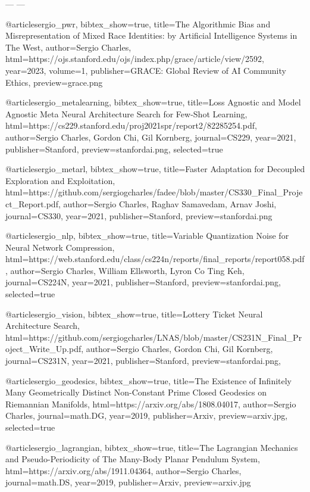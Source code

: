 ---
---


@article{sergio_pwr,
  bibtex_show={true},
  title={The Algorithmic Bias and Misrepresentation of Mixed Race Identities: by Artificial Intelligence Systems in The West},
  author={Sergio Charles},
  html={https://ojs.stanford.edu/ojs/index.php/grace/article/view/2592},
  year={2023},
  volume={1},
  publisher={GRACE: Global Review of AI Community Ethics},
  preview={grace.png}
}

@article{sergio_metalearning,
  bibtex_show={true},
  title={Loss Agnostic and Model Agnostic Meta Neural Architecture Search for Few-Shot Learning},
  html={https://cs229.stanford.edu/proj2021spr/report2/82285254.pdf},
  author={Sergio Charles, Gordon Chi, Gil Kornberg},
  journal={CS229},
  year={2021},
  publisher={Stanford},
  preview={stanfordai.png},
  selected={true}
}

@article{sergio_metarl,
  bibtex_show={true},
  title={Faster Adaptation for Decoupled Exploration and Exploitation},
  html={https://github.com/sergiogcharles/fadee/blob/master/CS330_Final_Project_Report.pdf},
  author={Sergio Charles, Raghav Samavedam, Arnav Joshi},
  journal={CS330},
  year={2021},
  publisher={Stanford},
  preview={stanfordai.png}
}

@article{sergio_nlp,
  bibtex_show={true},
  title={Variable Quantization Noise for Neural Network Compression},
  html={https://web.stanford.edu/class/cs224n/reports/final_reports/report058.pdf},
  author={Sergio Charles, William Ellsworth, Lyron Co Ting Keh},
  journal={CS224N},
  year={2021},
  publisher={Stanford},
  preview={stanfordai.png},
  selected={true}
}

@article{sergio_vision,
  bibtex_show={true},
  title={Lottery Ticket Neural Architecture Search},
  html={https://github.com/sergiogcharles/LNAS/blob/master/CS231N_Final_Project_Write_Up.pdf},
  author={Sergio Charles, Gordon Chi, Gil Kornberg},
  journal={CS231N},
  year={2021},
  publisher={Stanford},
  preview={stanfordai.png},
}

@article{sergio_geodesics,
  bibtex_show={true},
  title={The Existence of Infinitely Many Geometrically Distinct Non-Constant Prime Closed Geodesics on Riemannian Manifolds},
  html={https://arxiv.org/abs/1808.04017},
  author={Sergio Charles},
  journal={math.DG},
  year={2019},
  publisher={Arxiv},
  preview={arxiv.jpg},
  selected={true}
}

@article{sergio_lagrangian,
  bibtex_show={true},
  title={The Lagrangian Mechanics and Pseudo-Periodicity of The Many-Body Planar Pendulum System},
  html={https://arxiv.org/abs/1911.04364},
  author={Sergio Charles},
  journal={math.DS},
  year={2019},
  publisher={Arxiv},
  preview={arxiv.jpg}
}

